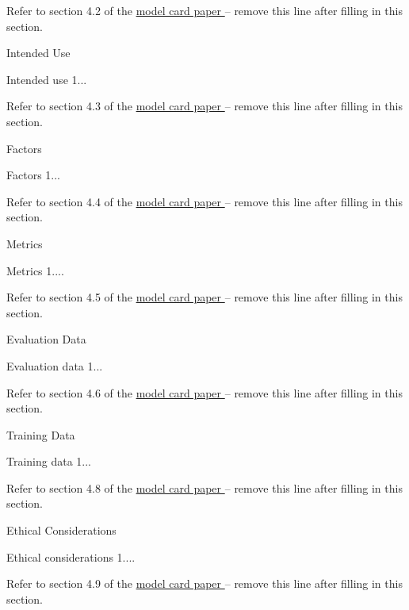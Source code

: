 \documentclass{article}
\begin{document}
\begin{adjustwidth}{-60pt}{-30pt}
\begin{singlespace}
\begin{tcolorbox}[title=\textbf{Model Card - CheXNet},
    breakable, sharp corners, boxrule=0.7pt]
{Refer to section 4.2 of the \href{https://arxiv.org/abs/1810.03993}{model card paper } -- remove this line after filling in this section.

\begin{mcsection}{Intended Use}
    \item Intended use 1...
\end{mcsection}

Refer to section 4.3 of the \href{https://arxiv.org/abs/1810.03993}{model card paper } -- remove this line after filling in this section.

\begin{mcsection}{Factors}
    \item Factors 1...
\end{mcsection}

Refer to section 4.4 of the \href{https://arxiv.org/abs/1810.03993}{model card paper } -- remove this line after filling in this section.

\begin{mcsection}{Metrics}
    \item Metrics 1....
\end{mcsection}

Refer to section 4.5 of the \href{https://arxiv.org/abs/1810.03993}{model card paper } -- remove this line after filling in this section.

\begin{mcsection}{Evaluation Data}
    \item Evaluation data 1...
\end{mcsection}

Refer to section 4.6 of the \href{https://arxiv.org/abs/1810.03993}{model card paper } -- remove this line after filling in this section.

\begin{mcsection}{Training Data}
    \item Training data 1...
\end{mcsection}

\pagebreak

Refer to section 4.8 of the \href{https://arxiv.org/abs/1810.03993}{model card paper } -- remove this line after filling in this section.

\begin{mcsection}{Ethical Considerations}
    \item Ethical considerations 1....
\end{mcsection}

Refer to section 4.9 of the \href{https://arxiv.org/abs/1810.03993}{model card paper } -- remove this line after filling in this section.

}
\end{tcolorbox}
\end{singlespace}
\end{adjustwidth}
\end{document}
